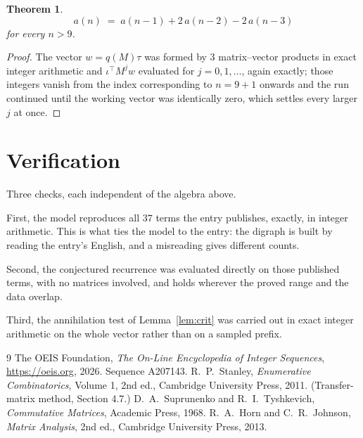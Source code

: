 \documentclass[11pt,a4paper]{article}
\theoremstyle{plain}
\newtheorem{theorem}{Theorem}
\theoremstyle{definition}
\begin{document}
\begin{theorem}
\[
a(n)\;=\;a(n-1) + 2\,a(n-2) - 2\,a(n-3)
\]
for every $n>9$.
\end{theorem}

\begin{proof}
The vector $w=q(M)\tau$ was formed by $3$ matrix--vector products in exact integer
arithmetic and $\iota^{\!\top}M^{j}w$ evaluated for $j=0,1,\dots$, again exactly; those
integers vanish from the index corresponding to $n=9+1$ onwards and the run continued
until the working vector was identically zero, which settles every larger $j$ at once.
\end{proof}

\section{Verification}

Three checks, each independent of the algebra above.

First, the model reproduces all $37$ terms the entry publishes, exactly, in integer
arithmetic. This is what ties the model to the entry: the digraph is built by reading the
entry's English, and a misreading gives different counts.

Second, the conjectured recurrence was evaluated directly on those published terms, with no
matrices involved, and holds wherever the proved range and the data overlap.

Third, the annihilation test of Lemma~\ref{lem:crit} was carried out in exact integer
arithmetic on the whole vector rather than on a sampled prefix.

\begin{thebibliography}{9}
 The OEIS Foundation, \emph{The On-Line Encyclopedia of Integer
Sequences}, \url{https://oeis.org}, 2026. Sequence A207143.
 R.~P.~Stanley, \emph{Enumerative Combinatorics}, Volume 1, 2nd ed.,
Cambridge University Press, 2011. (Transfer-matrix method, Section 4.7.)
 D.~A.~Suprunenko and R.~I.~Tyshkevich, \emph{Commutative Matrices},
Academic Press, 1968.
 R.~A.~Horn and C.~R.~Johnson, \emph{Matrix Analysis}, 2nd ed., Cambridge
University Press, 2013.
\end{thebibliography}
\end{document}
